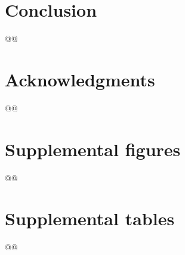 \documentclass[a4paper,11pt,abstracton,hidelinks]{scrartcl}
\begin{document}
\section{Conclusion}\label{sec:conclusion}


@@


\section{Acknowledgments}\label{sec:acknowledgments}


@@


\printbibliography


\clearpage
\beginsupplement
\section{Supplemental figures}\label{sec:supplemental-figures}


@@


\clearpage
\section{Supplemental tables}\label{sec:supplemental-tables}


@@
\end{document}
